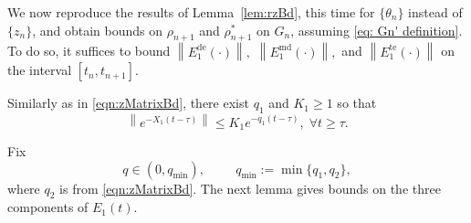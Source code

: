 \documentclass[usenames,dvipsnames,final,12pt]{colt2018} %
\newcommand{\vop}{VoP}
\newcommand{\hth}{h_1}
\newcommand{\Xt}{X_1}
\newcommand{\Wt}{W_1}
\newcommand{\Mt}{M^{(1)}}
\newcommand{\lt}{q_1}
\newcommand{\rt}{\rho}
\newcommand{\rtS}{\rho^{*}}
\newcommand{\bart}{\bar{\theta}}
\newcommand{\Et}{E_1}
\newcommand{\Kt}{K_1}
\newcommand{\tSol}[1]{\theta(#1, \tI{n_0}, \theta_{n_0})}
\newcommand{\zetD}{\zeta^{\dt}}
\newcommand{\zetM}{\zeta^{\md}}
\newcommand{\zetT}{\zeta^{\te}}
\newcommand{\EtD}{\Et^{\dt}}
\newcommand{\EtM}{\Et^{\md}}
\newcommand{\EtT}{\Et^{\te}}
\newcommand{\lz}{q_2}
\newcommand{\lmin}{q_{\min}}
\newcommand{\lm}{q}
\newcommand{\dt}{\text{de}}
\newcommand{\md}{\text{md}}
\newcommand{\te}{\text{te}}
\newcommand{\df}{\mathrm{d}}
\newcommand{\tI}[1]{t_{#1}}
\newcommand{\norm}[1]{\left\lVert#1\right\rVert}
\newcommand{\gal}[1]{#1}
\begin{document}
We now reproduce the results of Lemma~\ref{lem:rzBd},  this time for $\{\theta_n\}$ instead of $\{z_n\}$, and obtain bounds on $\rt_{n + 1}$ and $\rtS_{n + 1}$ on $G_n$, \gal{assuming \eqref{eq: Gn' definition}}.
%
\gal{To do so, it suffices to bound $\norm{\EtD(\cdot)},$ $\norm{\EtM(\cdot)},$ and $\norm{\EtT(\cdot)}$ on the interval $[\tI{n}, \tI{n + 1}].$}

Similarly as in \eqref{eqn:zMatrixBd}, there exist $\lt$ and $\Kt \geq 1$ so that
%
\begin{equation}
\label{eqn:tMatrixBd}
\norm{e^{-\Xt(t - \tau)}} \leq \Kt e^{-\lt(t - \tau)}, \; \forall t \geq \tau.
\end{equation}


Fix
\begin{equation}
\label{eq:lmdef}
\lm \in (0, \lmin), \hspace{1cm} \lmin := \min\{\lt, \lz\},
\end{equation}
where $\lz$  is from \eqref{eqn:zMatrixBd}.  The next lemma gives bounds on the three components of $\Et(t)$.
\end{document}
